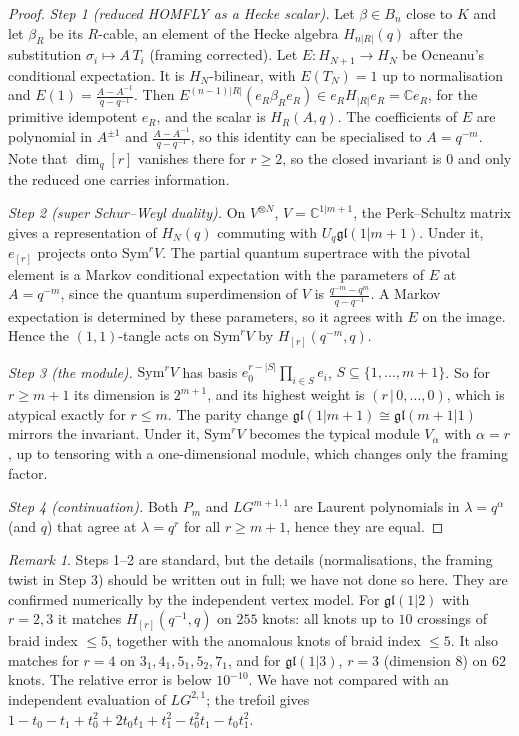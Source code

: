 \documentclass[11pt]{article}
\theoremstyle{definition}
\theoremstyle{remark}
\newtheorem{remark}[theorem]{Remark}
\newcommand{\gl}{\mathfrak{gl}}
\newcommand{\Sym}{\mathrm{Sym}}
\begin{document}
\begin{proof}
\emph{Step 1 (reduced HOMFLY as a Hecke scalar).}  Let $\beta\in B_n$ close to $K$ and let $\beta_R$ be its
$R$-cable, an element of the Hecke algebra $H_{n|R|}(q)$ after the substitution $\sigma_i\mapsto A\,T_i$ (framing
corrected).  Let $E:H_{N+1}\to H_N$ be Ocneanu's conditional expectation.  It is
$H_N$-bilinear, with $E(T_N)=1$ up to normalisation and $E(1)=\frac{A-A^{-1}}{q-q^{-1}}$.  Then
$E^{(n-1)|R|}(e_R\beta_Re_R)\in e_RH_{|R|}e_R=\mathbb{C}e_R$, for the primitive idempotent $e_R$, and the scalar is
$H_R(A,q)$.  The coefficients of $E$ are polynomial in $A^{\pm1}$ and $\frac{A-A^{-1}}{q-q^{-1}}$, so this identity
can be specialised to $A=q^{-m}$.  Note that $\dim_q[r]$ vanishes there for $r\ge2$, so the closed invariant is
$0$ and only the reduced one carries information.

\emph{Step 2 (super Schur--Weyl duality).}  On $V^{\otimes N}$, $V=\mathbb{C}^{1|m+1}$, the Perk--Schultz matrix gives a
representation of $H_N(q)$ commuting with $U_q\gl(1|m+1)$.  Under it, $e_{[r]}$ projects onto $\Sym^rV$.  The partial
quantum supertrace with the pivotal element is a Markov conditional expectation with the parameters of $E$ at
$A=q^{-m}$, since the quantum superdimension of $V$ is $\frac{q^{-m}-q^m}{q-q^{-1}}$.  A Markov expectation is
determined by these parameters, so it agrees with $E$ on the image.  Hence the $(1,1)$-tangle acts on $\Sym^rV$
by $H_{[r]}(q^{-m},q)$.

\emph{Step 3 (the module).}  $\Sym^rV$ has basis $e_0^{r-|S|}\prod_{i\in S}e_i$, $S\subseteq\{1,\dots,m+1\}$.  So
for $r\ge m+1$ its dimension is $2^{m+1}$, and its highest weight is $(r\,|\,0,\dots,0)$, which is atypical
exactly for $r\le m$.  The parity change $\gl(1|m+1)\cong\gl(m+1|1)$ mirrors the invariant.  Under it,
$\Sym^rV$ becomes the typical module $V_\alpha$ with $\alpha=r$, up to tensoring with a one-dimensional module, which
changes only the framing factor.

\emph{Step 4 (continuation).}  Both $P_m$ and $LG^{m+1,1}$ are Laurent polynomials in $\lambda=q^\alpha$ (and $q$)
that agree at $\lambda=q^r$ for all $r\ge m+1$, hence they are equal.
\end{proof}

\begin{remark}
Steps 1--2 are standard, but the details (normalisations, the framing twist in Step 3) should be written out in
full; we have not done so here.  They are confirmed numerically by the independent vertex model.  For
$\gl(1|2)$ with $r=2,3$ it matches $H_{[r]}(q^{-1},q)$ on $255$ knots: all knots up to $10$ crossings of braid
index $\le5$, together with the anomalous knots of braid index $\le5$.  It also matches for $r=4$ on
$3_1,4_1,5_1,5_2,7_1$, and for $\gl(1|3)$, $r=3$ (dimension $8$) on $62$ knots.  The relative error is below
$10^{-10}$.  We have not compared with an independent evaluation of $LG^{2,1}$; the trefoil gives
$1-t_0-t_1+t_0^2+2t_0t_1+t_1^2-t_0^2t_1-t_0t_1^2$.
\end{remark}
\end{document}
